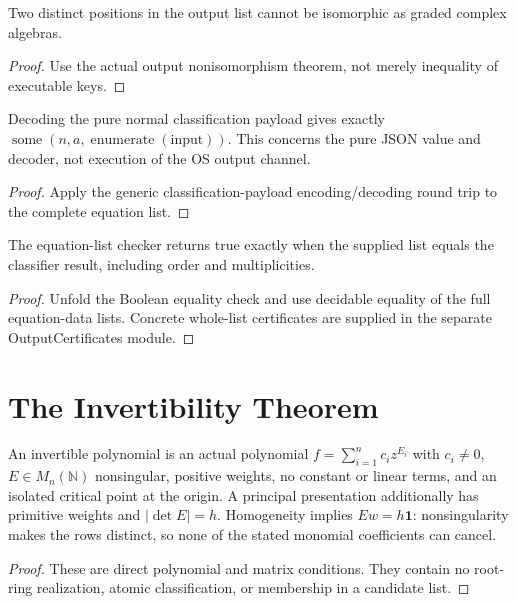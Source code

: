 \begin{theorem}
\label{thm:noniso}
\leanok
Two distinct positions in the output list cannot be isomorphic as graded complex algebras.
\end{theorem}
\begin{proof}
\leanok
{}
Use the actual output nonisomorphism theorem, not merely inequality of executable keys.
\end{proof}

\begin{theorem}
\label{thm:payload}
\leanok
Decoding the pure normal classification payload gives exactly $\operatorname{some}(n,a,\operatorname{enumerate}(\mathrm{input}))$. This concerns the pure JSON value and decoder, not execution of the OS output channel.
\end{theorem}
\begin{proof}
\leanok
{}
Apply the generic classification-payload encoding/decoding round trip to the complete equation list.
\end{proof}

\begin{theorem}
\label{thm:checker}
\leanok
The equation-list checker returns true exactly when the supplied list equals the classifier result, including order and multiplicities.
\end{theorem}
\begin{proof}
\leanok
{}
Unfold the Boolean equality check and use decidable equality of the full equation-data lists. Concrete whole-list certificates are supplied in the separate OutputCertificates module.
\end{proof}

\section{The Invertibility Theorem}

\begin{definition}
\label{def:invertible}
\leanok
An invertible polynomial is an actual polynomial $f=\sum_{i=1}^n c_i z^{E_i}$ with $c_i\ne0$, $E\in M_n(\mathbb N)$ nonsingular, positive weights, no constant or linear terms, and an isolated critical point at the origin. A principal presentation additionally has primitive weights and $|\det E|=h$. Homogeneity implies $Ew=h\mathbf1$: nonsingularity makes the rows distinct, so none of the stated monomial coefficients can cancel.
\end{definition}
\begin{proof}
\leanok
{}
These are direct polynomial and matrix conditions. They contain no root-ring realization, atomic classification, or membership in a candidate list.
\end{proof}

